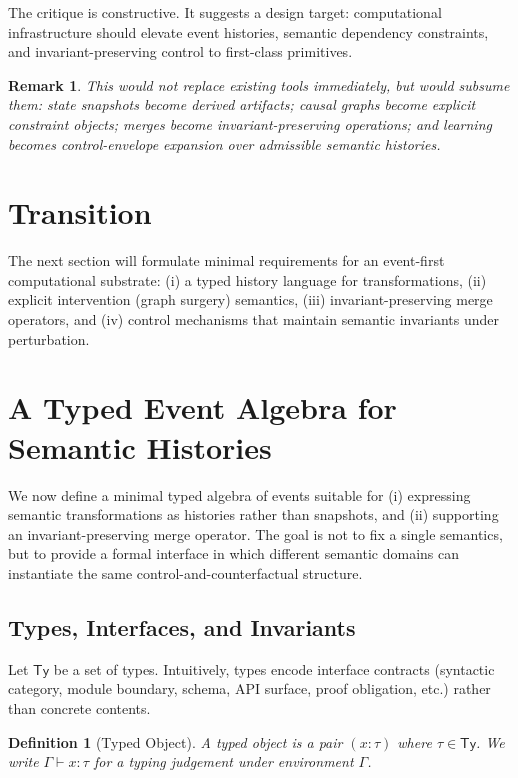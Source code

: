 \documentclass[11pt]{article}
\newtheorem{definition}{Definition}
\newtheorem{remark}{Remark}
\begin{document}
The critique is constructive. It suggests a design target: computational infrastructure should elevate event histories, semantic dependency constraints, and invariant-preserving control to first-class primitives.

\begin{remark}
This would not replace existing tools immediately, but would subsume them: state snapshots become derived artifacts; causal graphs become explicit constraint objects; merges become invariant-preserving operations; and learning becomes control-envelope expansion over admissible semantic histories.
\end{remark}

\section{Transition}
The next section will formulate minimal requirements for an event-first computational substrate: (i) a typed history language for transformations, (ii) explicit intervention (graph surgery) semantics, (iii) invariant-preserving merge operators, and (iv) control mechanisms that maintain semantic invariants under perturbation.

\section{A Typed Event Algebra for Semantic Histories}
\label{sec:typed_event_algebra}

We now define a minimal typed algebra of events suitable for (i) expressing semantic transformations as histories rather than snapshots, and (ii) supporting an invariant-preserving merge operator. The goal is not to fix a single semantics, but to provide a formal interface in which different semantic domains can instantiate the same control-and-counterfactual structure.

\subsection{Types, Interfaces, and Invariants}

Let $\mathsf{Ty}$ be a set of types. Intuitively, types encode interface contracts (syntactic category, module boundary, schema, API surface, proof obligation, etc.) rather than concrete contents.

\begin{definition}[Typed Object]
A \emph{typed object} is a pair $(x:\tau)$ where $\tau \in \mathsf{Ty}$. We write $\Gamma \vdash x:\tau$ for a typing judgement under environment $\Gamma$.
\end{definition}
\end{document}
